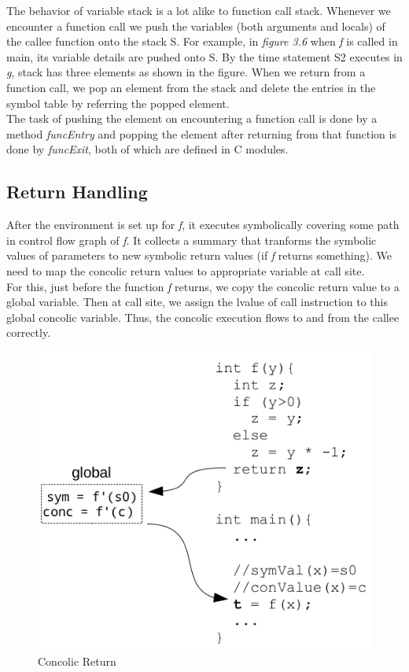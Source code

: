 \documentclass[12pt,oneside]{book}
\begin{document}
The behavior of variable stack is a lot alike to function call stack. Whenever we encounter a function call we push the variables (both arguments and locals) of the callee function onto the stack S. For example, in \textit{figure 3.6} when \textit{f} is called in main, its variable details are pushed onto S. By the time statement S2 executes in \textit{g}, stack has three elements as shown in the figure.
When we return from a function call, we pop an element from the stack and delete the entries in the symbol table by referring the popped element.\\
The task of pushing the element on encountering a function call is done by a method \textit{funcEntry} and popping the element after returning from that function is done by \textit{funcExit}, both of which are defined in C modules.

\subsection{Return Handling}
After the environment is set up for \textit{f}, it executes symbolically covering some path in control flow graph of \textit{f}. It collects a summary that tranforms the symbolic values of parameters to new symbolic return values (if \textit{f} returns something). We need to map the concolic return values to appropriate variable at call site.\\ 
For this, just before the function \textit{f} returns, we copy the concolic return value to a global variable. Then at call site, we assign the lvalue of call instruction to this global concolic variable. Thus, the concolic execution flows to and from the callee correctly.   

\vspace{0.3cm}
\begin{figure}[htbp]
\centering
\includegraphics[scale=0.40]{return.png}
\caption{Concolic Return}
\end{figure}
\end{document}
